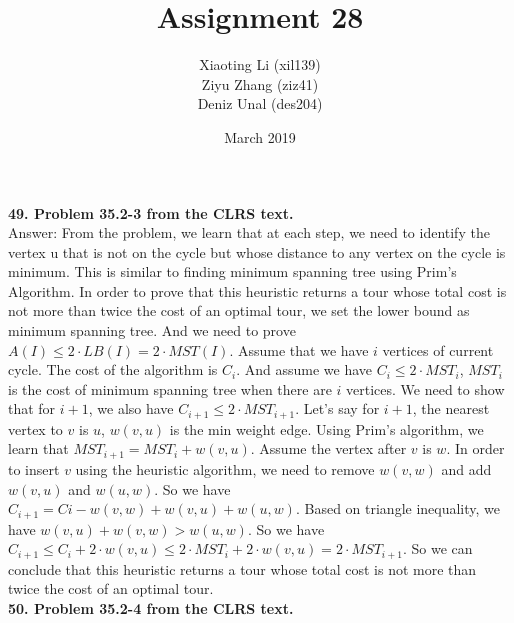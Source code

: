 \documentclass{article}
\title{Assignment 28}
\author{Xiaoting Li (xil139) \\
Ziyu Zhang (ziz41) \\
Deniz Unal (des204)}
\date{March 2019}
\begin{document}
\maketitle

\noindent
\textbf{49. Problem 35.2-3 from the CLRS text.} \\ \newline
Answer: From the problem, we learn that at each step, we need to  identify the vertex u that is not on the cycle but whose distance to any vertex on the cycle is minimum. This is similar to finding minimum spanning tree using Prim's Algorithm. In order to prove that this heuristic returns a tour whose total cost is not more than twice the cost of an optimal tour, we set the lower bound as minimum spanning tree. And we need to prove $A(I) \leq 2\cdot LB(I) = 2\cdot MST(I)$. Assume that we have $i$ vertices of current cycle. The cost of the algorithm is $C_{i}$. And assume we have $C_{i} \leq 2 \cdot MST_{i}$, $MST_{i}$ is the cost of minimum spanning tree when there are $i$ vertices. We need to show that for $i+1$, we also have $C_{i+1} \leq 2 \cdot MST_{i+1}$. Let's say for $i+1$, the nearest vertex to $v$ is $u$, $w(v, u)$ is the min weight edge. Using Prim's algorithm, we learn that $MST_{i+1} = MST_{i} + w(v, u)$. Assume the vertex after $v$ is $w$. In order to insert $v$ using the heuristic algorithm, we need to remove $w(v, w)$ and add $w(v, u)$ and $w(u, w)$. So we have $C_{i+1} = C{i} - w(v,w) + w(v, u) + w(u, w)$. Based on triangle inequality, we have $w(v, u) + w(v, w) > w(u, w)$. So we have $C_{i+1} \leq C_{i} + 2\cdot w(v,u) \leq 2\cdot MST_{i} + 2\cdot w(v,u) = 2\cdot MST_{i+1}$. So we can conclude that this heuristic returns a tour whose total cost is not more than twice the cost of an optimal tour.\\ \newline
\textbf{50. Problem 35.2-4 from the CLRS text.}\\ \newline
\end{document}
